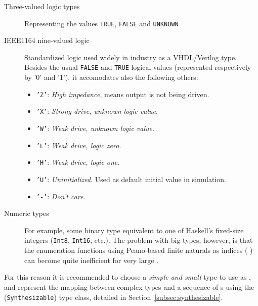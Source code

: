             \begin{description}
                \item[Three-valued logic types]
                    Representing the values \texttt{TRUE}, \texttt{FALSE} and \texttt{UNKNOWN}
                \item[IEEE1164 nine-valued logic]
                    Standardized logic used widely in industry as a VHDL/Verilog type.
                    Besides the usual \texttt{FALSE} and \texttt{TRUE} logical values
                    (represented respectively by '0' and '1'),
                    it accomodates also the following others:
                    \begin{itemize}
                        \item \texttt{'Z'}: \emph{High impedance}, means output is not being driven.
                        \item \texttt{'X'}: \emph{Strong drive, unknown logic value}.
                        \item \texttt{'W'}: \emph{Weak drive, unknown logic value}.
                        \item \texttt{'L'}: \emph{Weak drive, logic zero}.
                        \item \texttt{'H'}: \emph{Weak drive, logic one}.
                        \item \texttt{'U'}: \emph{Uninitialized}. Used as default initial value in simulation.
                        \item \texttt{'-'}: \emph{Don't care}.
                    \end{itemize}
                \item[Numeric types]
                    For example, some binary type equivalent to one of Haskell's fixed-size integers
                    (\texttt{Int8}, \texttt{Int16}, etc.).
                    The problem with big  types, however, is that the enumeration functions
                    using Peano-based finite naturals as indices ( ) can become quite
                    inefficient for very large .
            \end{description}

            For this reason it is recommended to choose a \emph{simple and small} type to use as ,
            and represent the mapping between complex types and a sequence of s using
            the  (\texttt{Synthesizable}) type class, detailed in Section~\ref{subsec:synthesizable}.



